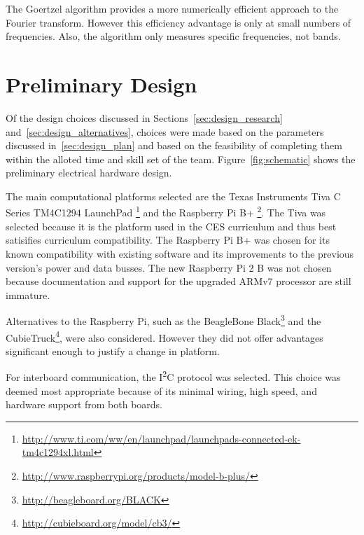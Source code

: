 \documentclass{article}
\begin{document}
                The Goertzel algorithm provides a more numerically efficient approach
                to the Fourier transform.
                However this efficiency advantage is only at small numbers
                of frequencies.
                Also, the algorithm only measures specific frequencies,
                not bands.

\clearpage
\FloatBarrier
\section{Preliminary Design} %
    \label{sec:preliminary_design}

    Of the design choices discussed in Sections~\ref{sec:design_research}
    and~\ref{sec:design_alternatives},
    choices were made based on the parameters discussed in~\ref{sec:design_plan}
    and based on the feasibility of completing them within the alloted time
    and skill set of the team.
    Figure~\ref{fig:schematic} shows the preliminary electrical hardware design.
    
    The main computational platforms selected are the
    Texas Instruments Tiva C Series TM4C1294 LaunchPad%
    \footnote{\url{http://www.ti.com/ww/en/launchpad/launchpads-connected-ek-tm4c1294xl.html}}
    and the Raspberry Pi B+%
    \footnote{\url{http://www.raspberrypi.org/products/model-b-plus/}}.
    The Tiva was selected because it is the platform
    used in the CES curriculum
    and thus best satisifies curriculum compatibility.
    The Raspberry Pi B+ was chosen
    for its known compatibility with existing software
    and its improvements to the previous version's
    power and data busses.
    The new Raspberry Pi 2 B was not chosen
    because documentation and support for the upgraded ARMv7 processor
    are still immature.
    
    Alternatives to the Raspberry Pi, such as
    the BeagleBone Black\footnote{\url{http://beagleboard.org/BLACK}}
    and the CubieTruck\footnote{\url{http://cubieboard.org/model/cb3/}},
    were also considered.
    However they did not offer advantages significant enough
    to justify a change in platform.
    
    For interboard communication,
    the I\textsuperscript{2}C protocol was selected.
    This choice was deemed most appropriate
    because of its minimal wiring, high speed,
    and hardware support from both boards.
    
\end{document}
